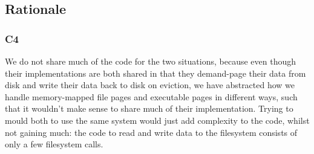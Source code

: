 \documentclass[a4wide, 11pt]{article}
\begin{document}
\subsection{Rationale}
\subsubsection{C4}

We do not share much of the code for the two situations, because even though their implementations are both shared in that they demand-page their data from disk and write their data back to disk on eviction, we have abstracted how we handle memory-mapped file pages and executable pages in different ways, such that it wouldn't make sense to share much of their implementation. Trying to mould both to use the same system would just add complexity to the code, whilst not gaining much: the code to read and write data to the filesystem consists of only a few filesystem calls.
\end{document}
